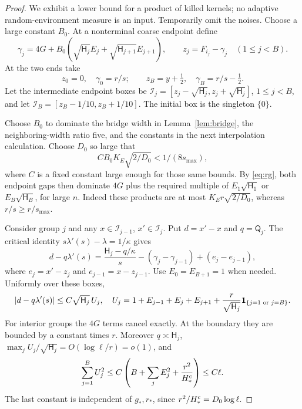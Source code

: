 \documentclass[11pt]{article}
\theoremstyle{definition}\newtheorem{definition}[theorem]{Definition}
\theoremstyle{remark}\newtheorem{remark}[theorem]{Remark}
\numberwithin{equation}{section}\allowdisplaybreaks
\begin{document}
\begin{proof}
We exhibit a lower bound for a product of killed kernels; no adaptive
random-environment measure is an input. Temporarily omit the noises.
Choose a large constant $B_0$. At a nonterminal coarse endpoint define
\[
 \gamma_j=4G+B_0(\sqrt{\mathsf H_j}E_j+
                         \sqrt{\mathsf H_{j+1}}E_{j+1}),
 \qquad z_j=F_{i_j}-\gamma_j \quad(1\le j<B).
\]
At the two ends take
\[
 z_0=0,\quad\gamma_0=r/s;\qquad
 z_B=y+\tfrac12,\quad\gamma_B=r/s-\tfrac12.
\]
Let the intermediate endpoint boxes be
$\mathcal I_j=[z_j-\sqrt{\mathsf H_j},z_j+\sqrt{\mathsf H_j}]$,
$1\le j<B$, and let $\mathcal I_B=[z_B-1/10,z_B+1/10]$.
The initial box is the singleton $\{0\}$.

Choose $B_0$ to dominate the bridge width in Lemma~\ref{lem:bridge},
the neighboring-width ratio five, and the constants in the next
interpolation calculation. Choose $D_0$ so large that
\[
 C B_0 K_E\sqrt{2/D_0}<1/(8s_{\max}),
\]
where $C$ is a fixed constant large enough for those same bounds.
By \eqref{eq:rg}, both endpoint gaps then dominate $4G$ plus the required
multiple of $E_1\sqrt{\mathsf H_1}$ or
$E_B\sqrt{\mathsf H_B}$, for large $n$. Indeed these products are at
most $K_E r\sqrt{2/D_0}$, whereas $r/s\ge r/s_{\max}$.

Consider group $j$ and any $x\in\mathcal I_{j-1}$,
$x'\in\mathcal I_j$. Put $d=x'-x$ and $q=\mathsf Q_j$.
The critical identity $s\lambda'(s)-\lambda=1/\kappa$ gives
\begin{equation}\label{eq:box-drift}
 d-q\lambda'(s)
 =\frac{\mathsf H_j-q/\kappa}{s}
   -(\gamma_j-\gamma_{j-1})+(e_j-e_{j-1}),
\end{equation}
where $e_j=x'-z_j$ and $e_{j-1}=x-z_{j-1}$.
Use $E_0=E_{B+1}=1$ when needed. Uniformly over these boxes,
\begin{equation}\label{eq:Ub}
 |d-q\lambda'(s)|\le C\sqrt{\mathsf H_j}\,U_j,
 \quad
 U_j=1+E_{j-1}+E_j+E_{j+1}
       +\frac r{\sqrt{\mathsf H_j}}\mathbf1_{\{j=1\text{ or }j=B\}}.
\end{equation}
For interior groups the $4G$ terms cancel exactly. At the boundary they
are bounded by a constant times $r$. Moreover $q\asymp\mathsf H_j$,
$\max_j U_j/\sqrt{\mathsf H_j}=O(\log\ell/r)=o(1)$, and
\begin{equation}\label{eq:box-energy}
 \sum_{j=1}^B U_j^2
 \le C\left(B+\sum_jE_j^2+\frac{r^2}{H_*^{\rm c}}\right)
 \le C\ell.
\end{equation}
The last constant is independent of $g_*,r_*$, since
$r^2/H_*^{\rm c}=D_0\log\ell$.


\end{proof}
\end{document}
